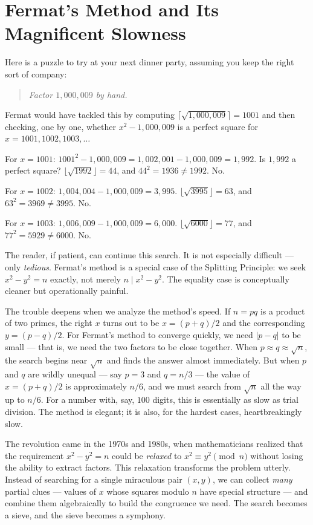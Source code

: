 \documentclass[11pt,twoside,openright]{book}
\theoremstyle{definition}
\theoremstyle{remark}
\begin{document}
\section{Fermat's Method and Its Magnificent Slowness}

Here is a puzzle to try at your next dinner party, assuming you keep the right sort of company:

\begin{quote}
\textit{Factor $1{,}000{,}009$ by hand.}
\end{quote}
Fermat would have tackled this by computing $\lceil \sqrt{1{,}000{,}009} \rceil = 1001$ and then checking, one by one, whether $x^2 - 1{,}000{,}009$ is a perfect square for $x = 1001, 1002, 1003, \ldots$

For $x = 1001$: $1001^2 - 1{,}000{,}009 = 1{,}002{,}001 - 1{,}000{,}009 = 1{,}992$. Is $1{,}992$ a perfect square? $\lfloor \sqrt{1992} \rfloor = 44$, and $44^2 = 1936 \neq 1992$. No.

For $x = 1002$: $1{,}004{,}004 - 1{,}000{,}009 = 3{,}995$. $\lfloor \sqrt{3995} \rfloor = 63$, and $63^2 = 3969 \neq 3995$. No.

For $x = 1003$: $1{,}006{,}009 - 1{,}000{,}009 = 6{,}000$. $\lfloor \sqrt{6000} \rfloor = 77$, and $77^2 = 5929 \neq 6000$. No.

The reader, if patient, can continue this search. It is not especially difficult --- only \textit{tedious}. Fermat's method is a special case of the Splitting Principle: we seek $x^2 - y^2 = n$ exactly, not merely $n \mid x^2 - y^2$. The equality case is conceptually cleaner but operationally painful.

The trouble deepens when we analyze the method's speed. If $n = pq$ is a product of two primes, the right $x$ turns out to be $x = (p + q)/2$ and the corresponding $y = (p - q)/2$. For Fermat's method to converge quickly, we need $|p - q|$ to be small --- that is, we need the two factors to be close together. When $p \approx q \approx \sqrt{n}$, the search begins near $\sqrt{n}$ and finds the answer almost immediately. But when $p$ and $q$ are wildly unequal --- say $p = 3$ and $q = n/3$ --- the value of $x = (p + q)/2$ is approximately $n/6$, and we must search from $\sqrt{n}$ all the way up to $n/6$. For a number with, say, $100$ digits, this is essentially as slow as trial division. The method is elegant; it is also, for the hardest cases, heartbreakingly slow.



The revolution came in the 1970s and 1980s, when mathematicians realized that the requirement $x^2 - y^2 = n$ could be \textit{relaxed} to $x^2 \equiv y^2 \pmod{n}$ without losing the ability to extract factors. This relaxation transforms the problem utterly. Instead of searching for a single miraculous pair $(x, y)$, we can collect \textit{many} partial clues --- values of $x$ whose squares modulo $n$ have special structure --- and combine them algebraically to build the congruence we need. The search becomes a sieve, and the sieve becomes a symphony.
\end{document}
